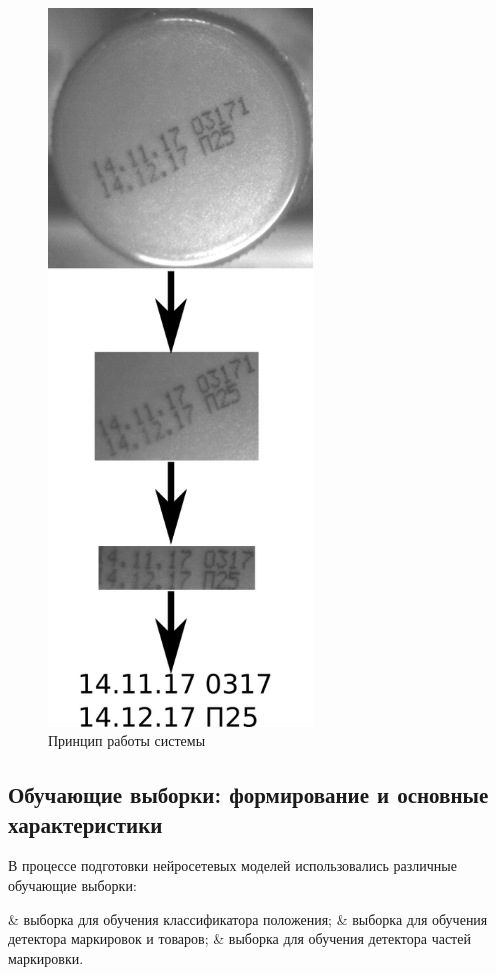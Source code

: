 \begin{figure}[!ht]
	\centering
	\includegraphics[width=7cm]{man-source/images/ch4/pic4-5.png}
	\caption{Принцип работы системы}
	\label{fig:system_work}
\end{figure}

\subsection{Обучающие выборки: формирование и основные характеристики}

В процессе подготовки нейросетевых моделей использовались различные обучающие выборки:

\begin{easylist}
	& выборка для обучения классификатора положения;
	& выборка для обучения детектора маркировок и товаров;
	& выборка для обучения детектора частей маркировки.
\end{easylist} 

